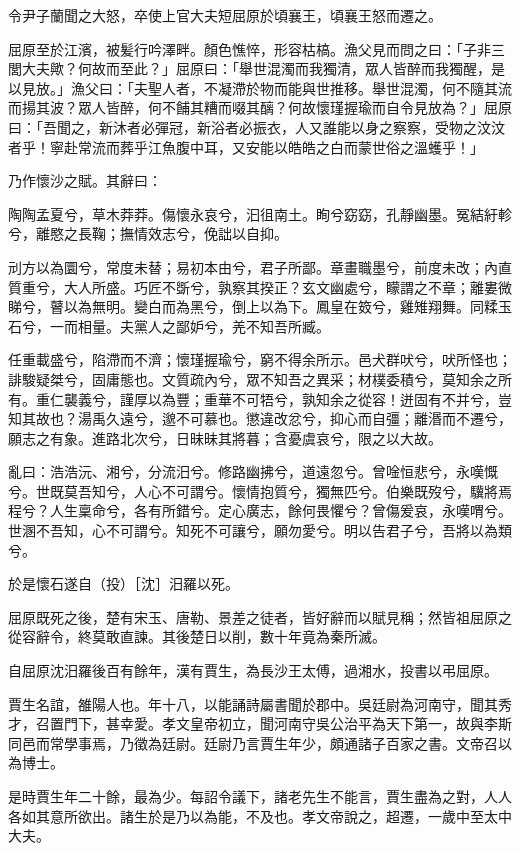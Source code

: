 \begin{pinyinscope}
令尹子蘭聞之大怒，卒使上官大夫短屈原於頃襄王，頃襄王怒而遷之。

屈原至於江濱，被髪行吟澤畔。顏色憔悴，形容枯槁。漁父見而問之曰：「子非三閭大夫歟？何故而至此？」屈原曰：「舉世混濁而我獨清，眾人皆醉而我獨醒，是以見放。」漁父曰：「夫聖人者，不凝滯於物而能與世推移。舉世混濁，何不隨其流而揚其波？眾人皆醉，何不餔其糟而啜其醨？何故懷瑾握瑜而自令見放為？」屈原曰：「吾聞之，新沐者必彈冠，新浴者必振衣，人又誰能以身之察察，受物之汶汶者乎！寧赴常流而葬乎江魚腹中耳，又安能以皓皓之白而蒙世俗之溫蠖乎！」

乃作懷沙之賦。其辭曰：

陶陶孟夏兮，草木莽莽。傷懷永哀兮，汩徂南土。眴兮窈窈，孔靜幽墨。冤結紆軫兮，離愍之長鞠；撫情效志兮，俛詘以自抑。

刓方以為圜兮，常度未替；易初本由兮，君子所鄙。章畫職墨兮，前度未改；內直質重兮，大人所盛。巧匠不斲兮，孰察其揆正？玄文幽處兮，矇謂之不章；離婁微睇兮，瞽以為無明。變白而為黑兮，倒上以為下。鳳皇在笯兮，雞雉翔舞。同糅玉石兮，一而相量。夫黨人之鄙妒兮，羌不知吾所臧。

任重載盛兮，陷滯而不濟；懷瑾握瑜兮，窮不得余所示。邑犬群吠兮，吠所怪也；誹駿疑桀兮，固庸態也。文質疏內兮，眾不知吾之異采；材樸委積兮，莫知余之所有。重仁襲義兮，謹厚以為豐；重華不可牾兮，孰知余之從容！迸固有不并兮，豈知其故也？湯禹久遠兮，邈不可慕也。懲違改忿兮，抑心而自彊；離湣而不遷兮，願志之有象。進路北次兮，日昧昧其將暮；含憂虞哀兮，限之以大故。

亂曰：浩浩沅、湘兮，分流汨兮。修路幽拂兮，道遠忽兮。曾唫恒悲兮，永嘆慨兮。世既莫吾知兮，人心不可謂兮。懷情抱質兮，獨無匹兮。伯樂既歿兮，驥將焉程兮？人生稟命兮，各有所錯兮。定心廣志，餘何畏懼兮？曾傷爰哀，永嘆喟兮。世溷不吾知，心不可謂兮。知死不可讓兮，願勿愛兮。明以告君子兮，吾將以為類兮。

於是懷石遂自（投）［沈］汨羅以死。

屈原既死之後，楚有宋玉、唐勒、景差之徒者，皆好辭而以賦見稱；然皆祖屈原之從容辭令，終莫敢直諫。其後楚日以削，數十年竟為秦所滅。

自屈原沈汨羅後百有餘年，漢有賈生，為長沙王太傅，過湘水，投書以弔屈原。

賈生名誼，雒陽人也。年十八，以能誦詩屬書聞於郡中。吳廷尉為河南守，聞其秀才，召置門下，甚幸愛。孝文皇帝初立，聞河南守吳公治平為天下第一，故與李斯同邑而常學事焉，乃徵為廷尉。廷尉乃言賈生年少，頗通諸子百家之書。文帝召以為博士。

是時賈生年二十餘，最為少。每詔令議下，諸老先生不能言，賈生盡為之對，人人各如其意所欲出。諸生於是乃以為能，不及也。孝文帝說之，超遷，一歲中至太中大夫。


\end{pinyinscope}
